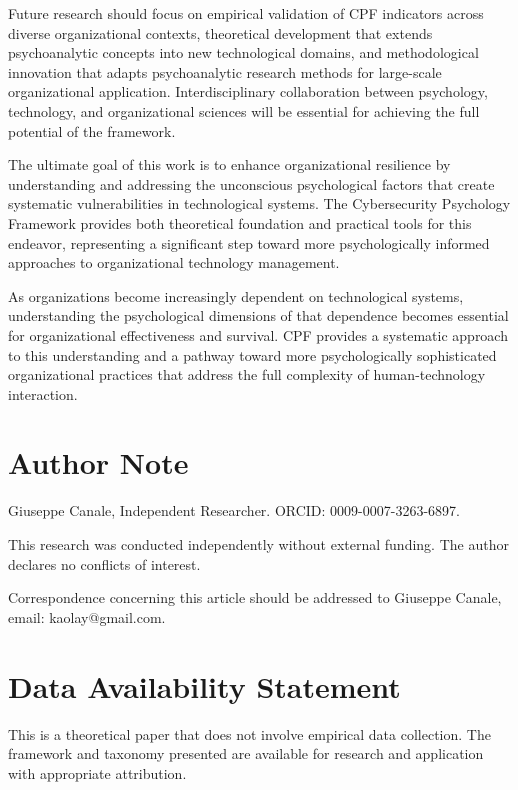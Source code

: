 \documentclass[10pt, twocolumn]{article}
\begin{document}
Future research should focus on empirical validation of CPF indicators across diverse organizational contexts, theoretical development that extends psychoanalytic concepts into new technological domains, and methodological innovation that adapts psychoanalytic research methods for large-scale organizational application. Interdisciplinary collaboration between psychology, technology, and organizational sciences will be essential for achieving the full potential of the framework.

The ultimate goal of this work is to enhance organizational resilience by understanding and addressing the unconscious psychological factors that create systematic vulnerabilities in technological systems. The Cybersecurity Psychology Framework provides both theoretical foundation and practical tools for this endeavor, representing a significant step toward more psychologically informed approaches to organizational technology management.

As organizations become increasingly dependent on technological systems, understanding the psychological dimensions of that dependence becomes essential for organizational effectiveness and survival. CPF provides a systematic approach to this understanding and a pathway toward more psychologically sophisticated organizational practices that address the full complexity of human-technology interaction.

\section*{Author Note}

Giuseppe Canale, Independent Researcher. ORCID: 0009-0007-3263-6897.

This research was conducted independently without external funding. The author declares no conflicts of interest.

Correspondence concerning this article should be addressed to Giuseppe Canale, email: kaolay@gmail.com.

\section*{Data Availability Statement}

This is a theoretical paper that does not involve empirical data collection. The framework and taxonomy presented are available for research and application with appropriate attribution.
\end{document}
